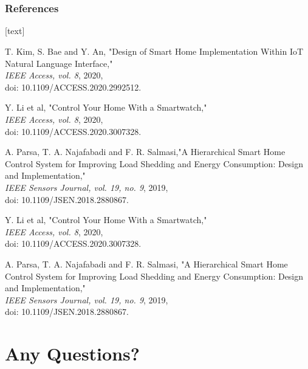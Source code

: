 \documentclass{beamer}
\begin{document}
\section[References]{}
\begin{frame}[allowframebreaks]
\frametitle{References}

[text]
\begin{thebibliography}{10}

\small T. Kim, S. Bae and Y. An, "Design of Smart Home Implementation Within IoT Natural Language Interface,"\\ \textit{IEEE Access, vol. 8}, 2020, 
\\ doi: 10.1109/ACCESS.2020.2992512.

Y. Li et al, "Control Your Home With a Smartwatch,"\\ \textit{IEEE Access, vol. 8}, 2020,\\  doi: 10.1109/ACCESS.2020.3007328.

A. Parsa, T. A. Najafabadi and F. R. Salmasi,"A Hierarchical Smart Home Control System for Improving Load Shedding and Energy Consumption: Design and Implementation,"\\ \textit{IEEE Sensors Journal, vol. 19, no. 9}, 2019,
\\ doi: 10.1109/JSEN.2018.2880867.

Y. Li et al, "Control Your Home With a Smartwatch,"\\ \textit{IEEE Access, vol. 8}, 2020,\\ doi: 10.1109/ACCESS.2020.3007328.

A. Parsa, T. A. Najafabadi and F. R. Salmasi, "A Hierarchical Smart Home Control System for Improving Load Shedding and Energy Consumption: Design and Implementation,"
\\ \textit{IEEE Sensors Journal, vol. 19, no. 9}, 2019,
\\ doi: 10.1109/JSEN.2018.2880867.

\end{thebibliography}

\end{frame}
	
\section[Thank you !]{Any Questions?}
\end{document}
